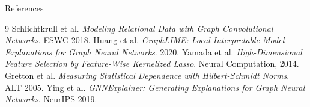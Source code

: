 \documentclass[10pt,aspectratio=169]{beamer}
\begin{document}
\begin{frame}{References}
  \scriptsize
  \begin{thebibliography}{9}
    \setlength{\itemsep}{0.35em}
     Schlichtkrull et al.
      \newblock \emph{Modeling Relational Data with Graph Convolutional
      Networks}. ESWC 2018.
     Huang et al.
      \newblock \emph{GraphLIME: Local Interpretable Model Explanations for
      Graph Neural Networks}. 2020.
     Yamada et al.
      \newblock \emph{High-Dimensional Feature Selection by Feature-Wise
      Kernelized Lasso}. Neural Computation, 2014.
     Gretton et al.
      \newblock \emph{Measuring Statistical Dependence with Hilbert-Schmidt
      Norms}. ALT 2005.
     Ying et al.
      \newblock \emph{GNNExplainer: Generating Explanations for Graph Neural
      Networks}. NeurIPS 2019.
  \end{thebibliography}
\end{frame}
\end{document}

